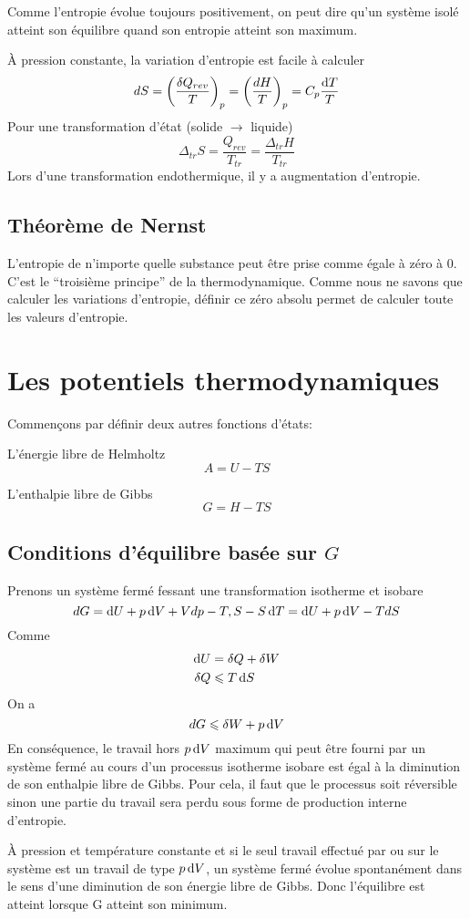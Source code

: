 Comme l'entropie évolue toujours positivement,
on peut dire qu'un système isolé atteint son équilibre
quand son entropie atteint son maximum.

À pression constante, la variation d'entropie est facile à calculer
\[ dS = \left(\frac{\delta Q_{rev}}{T}\right)_p =
\left(\frac{dH}{T}\right)_p = C_p\frac{\operatorname{d}\! T}{T} \]
Pour une transformation d'état (solide $\longrightarrow$ liquide)
\[ \Delta_{tr}S = \frac{Q_{rev}}{T_{tr}} = \frac{\Delta_{tr}H}{T_{tr}} \]
Lors d'une transformation endothermique, il y a augmentation d'entropie.

\subsection{Théorème de Nernst}
L'entropie de n'importe quelle substance peut être prise
comme égale à zéro à \si{0}{\kelvin}.
C'est le ``troisième principe'' de la thermodynamique.
Comme nous ne savons que calculer les variations d'entropie,
définir ce zéro absolu permet de calculer toute les valeurs d'entropie.

\section{Les potentiels thermodynamiques}
Commençons par définir deux autres fonctions d'états:

L'énergie libre de Helmholtz
\[ A = U-TS \]

L'enthalpie libre de Gibbs
\[ G = H-TS \]

\subsection{Conditions d'équilibre basée sur $G$}
Prenons un système fermé fessant une transformation isotherme et isobare
\[ dG = \operatorname{d}\! U+p\operatorname{d}\! V+Vdp-T,S-S\operatorname{d}\! T = \operatorname{d}\! U+p\operatorname{d}\! V-TdS \]
Comme
\begin{align*}
\operatorname{d}\! U & = \delta Q+\delta W\\
\delta Q & \leqslant T\operatorname{d}\! S
\end{align*}
On a
\[ dG \leqslant \delta W + p\operatorname{d}\! V \]
En conséquence, le travail hors $p\operatorname{d}\! V$ maximum qui peut être fourni
par un système fermé au cours d'un processus isotherme isobare est égal
à la diminution de son enthalpie libre de Gibbs.
Pour cela, il faut que le processus soit réversible sinon une partie
du travail sera perdu sous forme de production interne d'entropie.

À pression et température constante et si le seul travail effectué par
ou sur le système est un travail de type $p\operatorname{d}\! V$,
un système fermé évolue spontanément dans le sens
d'une diminution de son énergie libre de Gibbs.
Donc l'équilibre est atteint lorsque G atteint son minimum.

